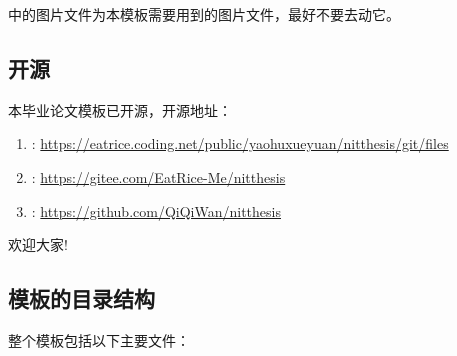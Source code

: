 \documentclass{nitthesis}
\begin{document}
中的图片文件为本模板需要用到的图片文件，最好不要去动它。

\subsection{开源}

本毕业论文模板已开源，开源地址：

\begin{enumerate}
    \item {}: \href{https://eatrice.coding.net/public/yaohuxueyuan/nitthesis/git/files}{https://eatrice.coding.net/public/yaohuxueyuan/nitthesis/git/files}
    \item {}: \href{https://gitee.com/EatRice-Me/nitthesis}{https://gitee.com/EatRice-Me/nitthesis}
    \item {}: \href{https://github.com/QiQiWan/nitthesis}{https://github.com/QiQiWan/nitthesis}
\end{enumerate}

欢迎大家!

\subsection{模板的目录结构}

整个模板包括以下主要文件：
\end{document}
